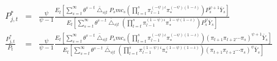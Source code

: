 \documentclass[11pt, a4paper]{article}
\begin{document}
\begin{itemize}
\normalsize
\begin{eqnarray*}
 P_{j,t}^* &=& \frac{\psi}{\psi-1} \frac{ E_t \left[  \sum_{s=t}^{\infty}  \theta^{s-t}  \bar{\bigtriangleup}_{s|t}  P_s mc_s \left(  \prod_{l=t}^s \pi_{l-1}^{(-\psi)\iota} \pi_*^{{(-\psi)(1-\iota)}}  \right) {P_s^{\psi+1}}\bar{ Y}_s\right]}{  E_t \left[  \sum_{s=t}^{\infty}  \theta^{s-t}  \bar{\bigtriangleup}_{s|t}   \left( \prod_{l=t}^s \pi_{l-1}^{(1-\psi)\iota} \pi_*^{{1-\psi}(1-\iota) } \right) P_s^{\psi} \bar{ Y}_s \right]}  \\
 \frac{P_{j,t}^*}{P_t} &=& \frac{\psi}{\psi-1} \frac  { E_t \left[  \sum_{s=t}^{\infty}  \theta^{s-t}  \bar{\bigtriangleup}_{s|t}  P_s mc_s \left(  \prod_{l=t}^s \pi_{l-1}^{(-\psi)\iota} \pi_*^{{(-\psi)(1-\iota)}}  \right) {{(\pi_{t+1}\pi_{t+2}\cdots \pi_{s})}^{\psi+1}}\bar{Y}_s\right]} {  E_t \left[  \sum_{s=t}^{\infty}  \theta^{s-t}  \bar{\bigtriangleup}_{s|t}  \left( \prod_{l=t}^s \pi_{l-1}^{(1-\psi)\iota} \pi_*^{{(1-\psi)}(1-\iota) }  \right){{(\pi_{t+1}\pi_{t+2}\cdots \pi_{s})}^{\psi}} \bar{Y}_s \right]} 
\end{eqnarray*}

\end{itemize}
\normalsize
\end{document}
